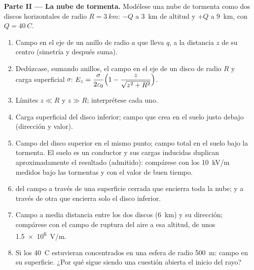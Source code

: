 \begin{problem}
\medskip
\noindent\textbf{Parte II --- La nube de tormenta.}
Modélese una nube de tormenta como dos discos horizontales de radio
$R = \qty{3}{km}$: $-Q$ a \qty{3}{km} de altitud y $+Q$ a \qty{9}{km}, con $Q = \qty{40}{C}$.
\begin{enumerate}[resume]
  \item Campo en el eje de un anillo de radio $a$ que lleva $q$, a la
        distancia $z$ de su centro (simetría y después suma).
  \item Dedúzcase, sumando anillos, el campo en el eje de un disco de
        radio $R$ y carga superficial $\sigma$:
        $E_z = \dfrac{\sigma}{2\varepsilon_0}\Bigl(1 - \dfrac{z}{\sqrt{z^2 + R^2}}\Bigr)$.
  \item Límites $z \ll R$ y $z \gg R$; interprétese cada uno.
  \item Carga superficial del disco inferior; campo que crea en el suelo
        justo debajo (dirección y valor).
  \item Campo del disco superior en el mismo punto; campo total en el
        suelo bajo la tormenta. El suelo es un conductor y sus cargas
        inducidas duplican aproximadamente el resultado (admitido):
        compárese con los \qty{10}{kV/m} medidos bajo las tormentas y con
        el valor de buen tiempo.
  \item {} del campo a través de una superficie cerrada que encierra
        toda la nube; y a través de otra que encierra solo el disco inferior.
  \item Campo a media distancia entre los dos discos (\qty{6}{km}) y su
        dirección; compárese con el campo de ruptura del aire a esa
        altitud, de unos \qty{1.5e6}{V/m}.
  \item Si los \qty{40}{C} estuvieran concentrados en una esfera de radio
        \qty{500}{m}: campo en su superficie. ¿Por qué sigue siendo una
        cuestión abierta el inicio del rayo?
\end{enumerate}


\end{problem}
